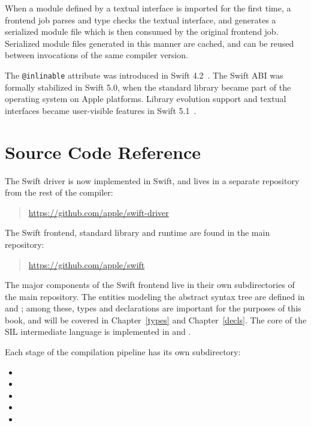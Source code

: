 \documentclass[../generics]{subfiles}
\begin{document}
When a module defined by a textual interface is imported for the first time, a frontend job parses and type checks the textual interface, and generates a serialized module file which is then consumed by the original frontend job. Serialized module files generated in this manner are cached, and can be reused between invocations of the same compiler version.

The \texttt{@inlinable} attribute was introduced in Swift 4.2~\cite{se0193}. The Swift ABI was formally stabilized in Swift 5.0, when the standard library became part of the operating system on Apple platforms. Library evolution support and textual interfaces became user-visible features in Swift 5.1~\cite{se0260}.

\section{Source Code Reference}\label{compilation model source reference}

The Swift driver is now implemented in Swift, and lives in a separate repository from the rest of the compiler:
\begin{quote}
\url{https://github.com/apple/swift-driver}
\end{quote}
The Swift frontend, standard library and runtime are found in the main repository:
\begin{quote}
\url{https://github.com/apple/swift}
\end{quote}
The major components of the Swift frontend live in their own subdirectories of the main repository. The entities modeling the abstract syntax tree are defined in  and ; among these, types and declarations are important for the purposes of this book, and will be covered in Chapter~\ref{types} and Chapter~\ref{decls}. The core of the SIL intermediate language is implemented in  and .

Each stage of the compilation pipeline has its own subdirectory:
\begin{itemize}
\item {}
\item {}
\item {}
\item {}
\item {}
\end{itemize}
\end{document}
